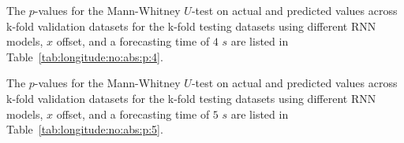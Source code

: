 The $p$-values for the Mann-Whitney $U$-test on actual and predicted values across k-fold validation datasets for the k-fold testing datasets using different RNN models, $x$ offset, and a forecasting time of $4$ $s$ are listed in Table~\ref{tab:longitude:no:abs:p:4}.

\begin{table}[!ht]
	\centering
	\caption{The $p$-values for the Mann-Whitney $U$-test on actual and predicted values across k-fold validation datasets for the k-fold testing datasets using different RNN models, $x$ offset, and a forecasting time of $4$ $s$.}
	\label{tab:longitude:no:abs:p:4}
\end{table}

The $p$-values for the Mann-Whitney $U$-test on actual and predicted values across k-fold validation datasets for the k-fold testing datasets using different RNN models, $x$ offset, and a forecasting time of $5$ $s$ are listed in Table~\ref{tab:longitude:no:abs:p:5}.


